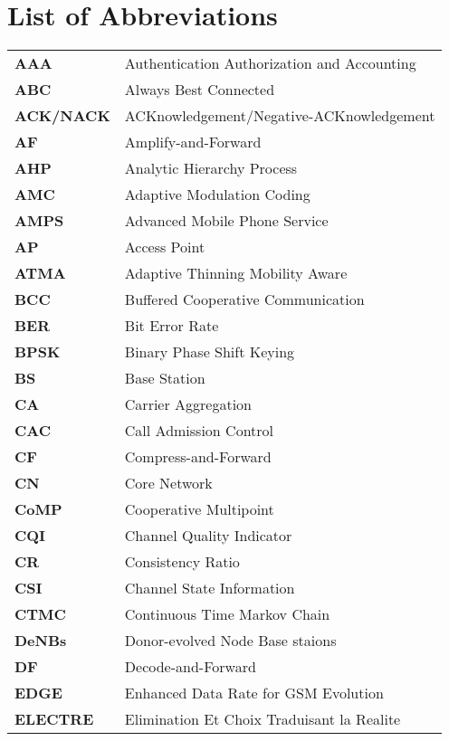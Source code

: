 	
			\chapter*{List of Abbreviations}
			\vspace{-20pt}
\begin{table}[h] \centering
\begin{adjustbox}{max width=\textwidth}
\begin{tabular}{ll}	
\textbf{AAA}&Authentication  Authorization and Accounting\\	
\textbf{ABC}&Always Best Connected  \\	
\textbf{ACK/NACK}&ACKnowledgement/Negative-ACKnowledgement  \\	\textbf{AF}&Amplify-and-Forward  \\			
\textbf{AHP}&Analytic Hierarchy Process \\
\textbf{AMC}&Adaptive Modulation Coding  \\			
\textbf{AMPS}&Advanced Mobile Phone Service \\			
\textbf{AP}&Access Point \\					
\textbf{ATMA}&Adaptive Thinning Mobility Aware \\			
\textbf{BCC}&Buffered Cooperative Communication \\			
\textbf{BER}&Bit Error Rate \\			
\textbf{BPSK}&Binary Phase Shift Keying \\			
\textbf{BS}&Base Station \\			
\textbf{CA}&Carrier Aggregation \\			
\textbf{CAC}&Call Admission Control\\			
\textbf{CF}&Compress-and-Forward \\		
\textbf{CN}&Core Network \\	
\textbf{CoMP}&Cooperative Multipoint \\			
\textbf{CQI}&Channel Quality Indicator \\		
\textbf{CR}&Consistency Ratio \\			
\textbf{CSI}&Channel State Information \\
\textbf{CTMC}&Continuous Time Markov Chain \\	
\textbf{DeNBs}&Donor-evolved Node Base staions \\			
\textbf{DF}&Decode-and-Forward \\			
\textbf{EDGE}& Enhanced Data Rate for GSM Evolution \\			
\textbf{ELECTRE}&Elimination Et Choix Traduisant la Realite \\			

\end{tabular}
\end{adjustbox}
\end{table}

